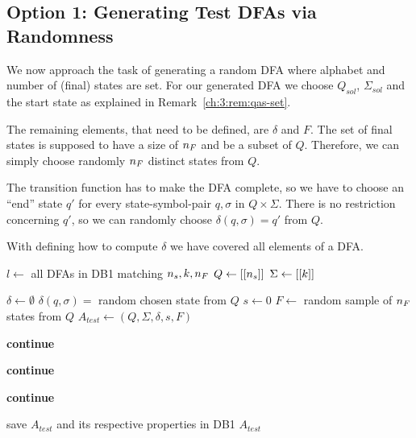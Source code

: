 \subsection{Option 1: Generating Test DFAs via Randomness}

We now approach the task of generating a random DFA where alphabet and number of (final) states are set. For our generated DFA we choose $Q_{sol}$, $\Sigma_{sol}$ and the start state as explained in Remark~\ref{ch:3:rem:qas-set}.

The remaining elements, that need to be defined, are $\delta$ and $F$. The set of final states is supposed to have a size of ${n_F}$ and be a subset of $Q$. Therefore, we can simply choose randomly ${n_F}$ distinct states from $Q$.

\noindent The transition function has to make the DFA complete, so we have to choose an ``end'' state $q'$ for every state-symbol-pair $q,\sigma$ in $Q \times \Sigma$. There is no restriction concerning $q'$, so we can randomly choose $\delta(q, \sigma) = q'$ from $Q$.

With defining how to compute $\delta$ we have covered all elements of a DFA.

\vspace{0.2cm}
\begin{algorithmic}[1]
	
		\vspace{0.2cm}
	
		\State $l \gets$ all DFAs in DB1 matching ${n_s}, k, {n_F}$
		\State $Q \gets[[{n_s}]]$
		\State $\Sigma \gets [[k]]$
		
		\vspace{0.2cm}
		
		
		\vspace{0.2cm}
		
			\State $\delta \gets \emptyset$
				\State $\delta(q,\sigma) = $ random chosen state from $Q$
			\EndFor
			\State $s \gets 0$
			\State $F \gets$ random sample of ${n_F}$ states from $Q$
			\State $A_{test} \gets (Q, \Sigma, \delta, s, F)$
			
			\vspace{0.2cm}
			
			\State \textbf{continue}
			\EndIf
			
			\State \textbf{continue}
			\EndIf
			
			\State \textbf{continue}
			\EndIf
			
			\vspace{0.2cm}
			
			\State save $A_{test}$ and its respective properties in DB1
			\State\Return $A_{test}$
		\EndWhile
	\EndFunction
\end{algorithmic}
\vspace{0.2cm}

